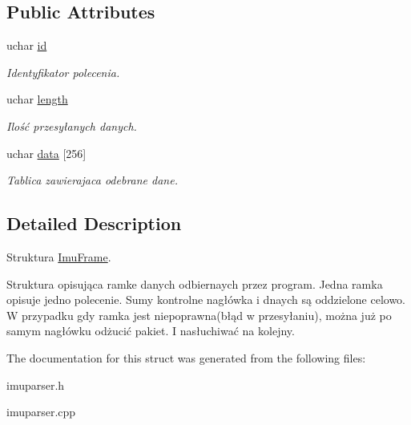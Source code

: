 \subsection*{Public Attributes}
\begin{DoxyCompactItemize}
\item 
\mbox{\label{struct_imu_frame_a502e1d6080bc28dea177d7e1e782dbf3}} 
uchar \mbox{\hyperlink{struct_imu_frame_a502e1d6080bc28dea177d7e1e782dbf3}{id}}
\begin{DoxyCompactList}\small\item\em Identyfikator polecenia. \end{DoxyCompactList}\item 
\mbox{\label{struct_imu_frame_af8e59d9cac30831c6d00d12e4ae4e518}} 
uchar \mbox{\hyperlink{struct_imu_frame_af8e59d9cac30831c6d00d12e4ae4e518}{length}}
\begin{DoxyCompactList}\small\item\em Ilość przesyłanych danych. \end{DoxyCompactList}\item 
\mbox{\label{struct_imu_frame_acda569b9f72732a10f14612504b08019}} 
uchar \mbox{\hyperlink{struct_imu_frame_acda569b9f72732a10f14612504b08019}{data}} \mbox{[}256\mbox{]}
\begin{DoxyCompactList}\small\item\em Tablica zawierajaca odebrane dane. \end{DoxyCompactList}\end{DoxyCompactItemize}


\subsection{Detailed Description}
Struktura \mbox{\hyperlink{struct_imu_frame}{Imu\+Frame}}. 

Struktura opisująca ramke danych odbiernaych przez program. Jedna ramka opisuje jedno polecenie. Sumy kontrolne nagłówka i dnaych są oddzielone celowo. W przypadku gdy ramka jest niepoprawna(błąd w przesyłaniu), można już po samym nagłówku odżucić pakiet. I nasłuchiwać na kolejny. 

The documentation for this struct was generated from the following files\+:\begin{DoxyCompactItemize}
\item 
imuparser.\+h\item 
imuparser.\+cpp\end{DoxyCompactItemize}
